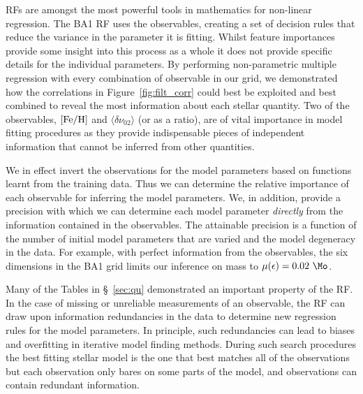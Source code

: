 RFs are amongst the most powerful tools in mathematics for non-linear regression. 
The BA1 RF uses the observables, creating a set of decision rules that reduce the variance in the parameter it is fitting.
Whilst feature importances provide some insight into this process as a whole it does not provide specific details for the individual parameters. 
By performing non-parametric multiple regression with every combination of observable in our grid,  
we demonstrated how the correlations in Figure~\ref{fig:filt_corr} could best be exploited and best combined to reveal the most information about each stellar quantity.
Two of the observables, $[\rm{Fe/H}]$ and $\langle\delta\nu_{02}\rangle$ (or as a ratio),  are of vital importance in model fitting procedures as they provide indispensable pieces of independent information that cannot be inferred from other quantities.  

We in effect invert the observations for the model parameters based on functions learnt from the training data. 
Thus we can determine the relative importance of each observable for inferring the model parameters. We, in addition, provide a precision with which we can determine each model parameter \emph{directly} from the information contained in the observables. 
The attainable precision is a function of the number of initial model parameters that are varied and the model degeneracy in the data. 
For example, with perfect information from the observables, the six dimensions in the BA1 grid limits our inference on mass to 
$\mu (\epsilon) =0.02 \ \Mo$. 


Many of the Tables in \S~\ref{sec:qu} demonstrated an important property of the RF. 
In the case of missing or unreliable measurements of an observable, the RF can draw upon information redundancies in the data to determine new regression rules for the model parameters.
In principle, such redundancies can lead to biases and overfitting in iterative model finding methods.
During such search procedures the best fitting stellar model is the one that best matches all of the observations but each observation only bares on some parts of the model, and observations can contain redundant information.


